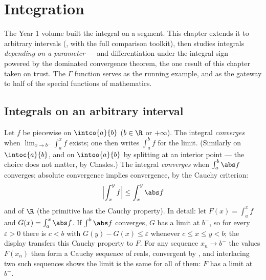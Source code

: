 \chapter{Integration}\label{ch:b2:integration}

The Year 1 volume built the integral on a segment. This chapter
extends it to arbitrary intervals (, with the full
comparison toolkit), then studies integrals \emph{depending on a
parameter} ---  and differentiation under the integral
sign --- powered by the dominated convergence theorem, the one
result of this chapter taken on trust. The $\Gamma$ function serves
as the running example, and as the gateway to half of the special
functions of mathematics.

\section{Integrals on an arbitrary interval}

\begin{definition}\label{def:b2:integration:improper}
Let $f$ be piecewise  on $\intco{a}{b}$ ($b \in \R$ or
$+\infty$). The integral \emph{converges}
when $\lim_{x \to b^-} \int_a^x f$ exists; one then writes
$\int_a^b f$ for the limit. (Similarly on $\intoc{a}{b}$, and on
$\intoo{a}{b}$ by splitting at an interior point --- the choice does
not matter, by Chasles.) The integral \emph{converges }
when $\int_a^b \abs f$ converges; absolute convergence implies
convergence, by the Cauchy criterion:
\[
\Bigl| \int_x^{y} f \Bigr| \leq \int_x^{y} \abs f
\]
and  of $\R$ (the primitive has the Cauchy property).
In detail: let $F(x) = \int_a^x f$ and $G(x) = \int_a^x \abs
f$. If $\int^b\abs f$ converges, $G$ has a limit at $b^-$, so
for every $\varepsilon > 0$ there is $c < b$ with $G(y) - G(x)
\leq \varepsilon$ whenever $c \leq x \leq y < b$; the display
transfers this Cauchy property to $F$. For any sequence $x_n
\to b^-$ the values $F(x_n)$ then form a Cauchy sequence of
reals, convergent by , and interlacing two such
sequences shows the limit is the same for all of them: $F$ has
a limit at $b^-$.
\end{definition}

